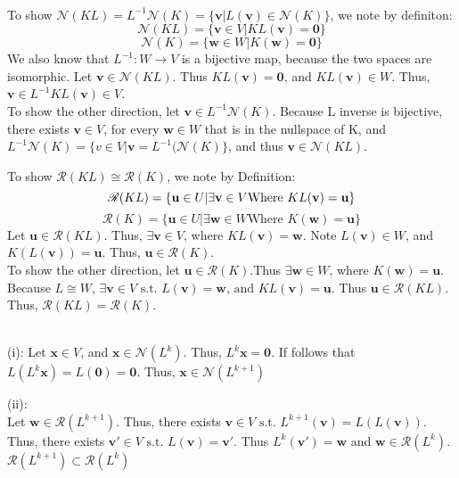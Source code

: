 \documentclass[letterpaper,12pt]{article}
\theoremstyle{definition}
\begin{document}
\\
To show $\mathscr{N}(KL) = L^{-1} \mathscr{N}(K) = \{\mathbf{v}| L(\mathbf{v}
    ) \in \mathscr{N}(K)\}$, we note by definiton:
\[
    \mathscr{N}(KL) = \{\mathbf{v} \in V | KL(\mathbf{v}) = \mathbf{0}\}
\]
\[
    \mathscr{N}(K) = \{\mathbf{w} \in W | K(\mathbf{w}) = \mathbf{0}\}
\]
We also know that $L^{-1}: W \rightarrow V$ is a bijective map, because the two spaces are
isomorphic. Let $\mathbf{v} \in \mathscr{N}(KL)$. Thus $KL(\mathbf{v}) = \mathbf{0}$, 
and $KL(\mathbf{v}) \in W$. Thus, $ \mathbf{v} \in L^{-1} KL(\mathbf{v}) \in V$.\\
To show the other direction, let $\mathbf{v} \in L^{-1} \mathscr{N}(K)$. Because L inverse is bijective, there exists $\mathbf{v} \in V$, for every $\mathbf{w} \in W$ that is in the nullspace of K, and $L^{-1} \mathscr{N}(K) = \{v \in V | \mathbf{v} = L^{-1}(\mathscr{N}(K)\}$, and thus $\mathbf{v} \in \mathscr{N}(KL)$.


To show $\mathscr{R}(KL) \cong \mathscr{R}(K)$, we note by Definition:
\begin{equation*}
    \mathscr{R}(KL) = \{\mathbf{u} \in U | \exists \mathbf{v} \in V 
        \text{Where } KL(\mathbf{v}) = \mathbf{u}\}\\
\end{equation*}
\begin{equation*}
    \mathscr{R}(K) = \{\mathbf{u} \in U | \exists \mathbf{w} \in W 
        \text{Where } K(\mathbf{w}) = \mathbf{u}\}
\end{equation*}
Let $\mathbf{u} \in \mathscr{R}(KL)$. Thus, $\exists \mathbf{v} \in V$, where $KL(\mathbf{v}) = \mathbf{w}$. 
Note $L(\mathbf{v}) \in W$, and $K(L(\mathbf{v})) = \mathbf{u}$. Thus, $\mathbf{u} \in \mathscr{R}(K)$.\\
To show the other direction, let $\mathbf{u} \in \mathscr{R}(K)$.Thus $\exists \mathbf{w} \in
W$, where $K(\mathbf{w}) = \mathbf{u}$. Because $L \cong W$, $\exists \mathbf{v} \in V 
\text{ s.t. } L(\mathbf{v}) = \mathbf{w} \text{, and } KL(\mathbf{v}) = \mathbf{u}$. Thus $\mathbf{u} \in \mathscr{R}(KL)$. \\
Thus, $\mathscr{R}(KL) = \mathscr{R}(K)$.

\\
(i): Let $\mathbf{x} \in V$, and $\mathbf{x} \in \mathscr{N} (L^k)$. Thus, 
$L^k \mathbf{x} = \mathbf{0}$. If follows that $L(L^k \mathbf{x}) = L(\mathbf{0} ) = \mathbf{0}$. Thus, $\mathbf{x} \in \mathscr{N}(L^{k+1})$

(ii): \\
Let $\mathbf{w} \in \mathscr{R}(L^{k+1})$.
Thus, there exists $\mathbf{v} \in V \text{ s.t. } 
L^{k+1}(\mathbf{v}) = L(L(\mathbf{v}))$.
Thus, there exists $ \mathbf{v'} \in V \text{ s.t. } L(\mathbf{v}) = \mathbf{v'}$. 
Thus $L^k(\mathbf{v'}) = \mathbf{w}$ and $\mathbf{w} \in \mathscr{R}(L^k)$.\\
$\mathscr{R} (L^{k+1}) \subset \mathscr{R}(L^k)$
\end{document}
